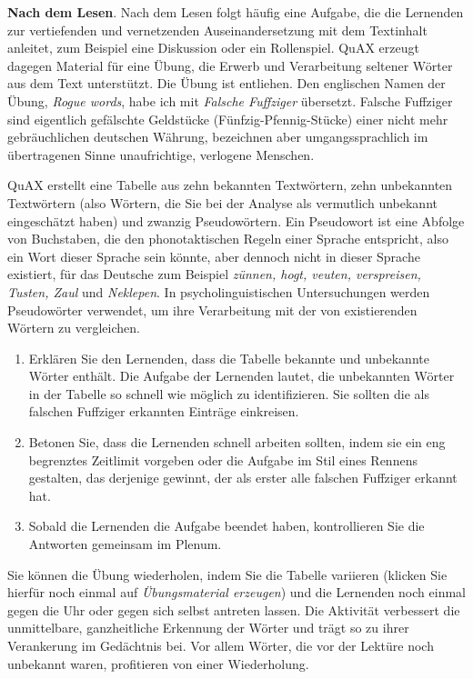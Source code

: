 \documentclass[11pt]{article}\usepackage[]{graphicx}\usepackage[]{color}
\begin{document}
\noindent \textbf{Nach dem Lesen}. Nach dem Lesen folgt häufig eine Aufgabe, die die Lernenden zur vertiefenden und vernetzenden Auseinandersetzung mit dem Textinhalt anleitet, zum Beispiel eine Diskussion oder ein Rollenspiel. QuAX erzeugt dagegen Material für eine Übung, die Erwerb und Verarbeitung seltener Wörter aus dem Text unterstützt. Die Übung ist \citet[105]{Watkins.2017} entliehen. Den englischen Namen der Übung, \textit{Rogue words}, habe ich mit \textit{Falsche Fuffziger} übersetzt. Falsche Fuffziger sind eigentlich gefälschte Geldstücke (Fünfzig-Pfennig-Stücke) einer nicht mehr gebräuchlichen deutschen Währung, bezeichnen aber umgangssprachlich im übertragenen Sinne unaufrichtige, verlogene Menschen. 

QuAX erstellt eine Tabelle aus zehn bekannten Textwörtern, zehn unbekannten Textwörtern (also Wörtern, die Sie bei der Analyse als vermutlich unbekannt eingeschätzt haben) und zwanzig Pseudowörtern. Ein Pseudowort ist eine Abfolge von Buchstaben, die den phonotaktischen Regeln einer Sprache entspricht, also ein Wort dieser Sprache sein könnte, aber dennoch nicht in dieser Sprache existiert, für das Deutsche zum Beispiel \textit{zünnen, hogt, veuten, verspreisen, Tusten, Zaul} und \textit{Neklepen}. In psycholinguistischen Untersuchungen werden Pseudowörter verwendet, um ihre Verarbeitung mit der von existierenden Wörtern zu vergleichen. 

\begin{enumerate}
\itemsep0em 
\item Erklären Sie den Lernenden, dass die Tabelle bekannte und unbekannte Wörter enthält. Die Aufgabe der Lernenden lautet, die unbekannten Wörter in der Tabelle so schnell wie möglich zu identifizieren. Sie sollten die als falschen Fuffziger erkannten Einträge einkreisen. 
\item Betonen Sie, dass die Lernenden schnell arbeiten sollten, indem sie ein eng begrenztes Zeitlimit vorgeben oder die Aufgabe im Stil eines Rennens gestalten, das derjenige gewinnt, der als erster alle falschen Fuffziger erkannt hat. 
\item Sobald die Lernenden die Aufgabe beendet haben, kontrollieren Sie die Antworten gemeinsam im Plenum.
\end{enumerate}

\noindent Sie können die Übung wiederholen, indem Sie die Tabelle variieren (klicken Sie hierfür noch einmal auf \textit{Übungsmaterial erzeugen}) und die Lernenden noch einmal gegen die Uhr oder gegen sich selbst antreten lassen. Die Aktivität verbessert die unmittelbare, ganzheitliche Erkennung der Wörter und trägt so zu ihrer Verankerung im Gedächtnis bei. Vor allem Wörter, die vor der Lektüre noch unbekannt waren, profitieren von einer Wiederholung. 
\end{document}
